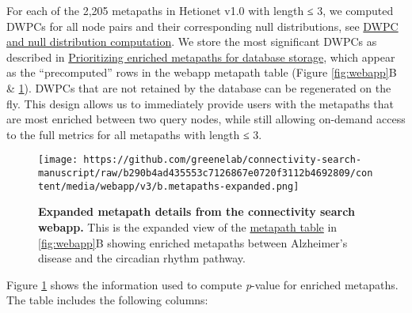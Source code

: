 For each of the 2,205 metapaths in Hetionet v1.0 with length ≤ 3,
we computed DWPCs for all node pairs and their corresponding null distributions, see \protect\hyperlink{dwpc-and-null-distribution-computation}{DWPC and null distribution computation}.
We store the most significant DWPCs as described in \protect\hyperlink{prioritizing-enriched-metapaths-for-database-storage}{Prioritizing enriched metapaths for database storage},
which appear as the ``precomputed'' rows in the webapp metapath table (Figure \ref{fig:webapp}B \& \ref{fig:webapp-metapaths}).
DWPCs that are not retained by the database can be regenerated on the fly.
This design allows us to immediately provide users with the metapaths that are most enriched between two query nodes,
while still allowing on-demand access to the full metrics for all metapaths with length ≤ 3.

\begin{figure}
\hypertarget{fig:webapp-metapaths}{%
\centering
\texttt{[image: https://github.com/greenelab/connectivity-search-manuscript/raw/b290b4ad435553c7126867e0720f3112b4692809/content/media/webapp/v3/b.metapaths-expanded.png]}
\caption{\textbf{Expanded metapath details from the connectivity search webapp.}
This is the expanded view of the \href{https://het.io/search/?source=17287\&target=7607\&metapaths=DaGiGpPW\%2CDdGiGpPW\%2CDdGpPW\%2CDlAeGpPW\%2CDrDaGpPW\%2CDrDuGpPW\%2CDuGiGpPW\&complete=}{metapath table} in \ref{fig:webapp}B showing enriched metapaths between Alzheimer's disease and the circadian rhythm pathway.}\label{fig:webapp-metapaths}
}
\end{figure}

Figure \ref{fig:webapp-metapaths} shows the information used to compute \emph{p}-value for enriched metapaths.
The table includes the following columns:

